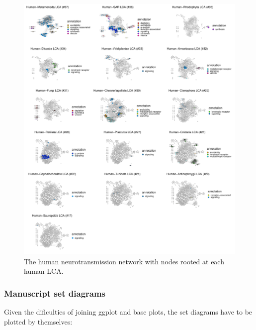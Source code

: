 \begin{figure}

{\centering \includegraphics{figs/analysis.network.unnamed-chunk-16-1} 

}

\caption{The human neurotransmission network with nodes rooted at each human LCA.}\label{fig:unnamed-chunk-16}
\end{figure}

\hypertarget{manuscript-set-diagrams}{%
\subsubsection{Manuscript set diagrams}\label{manuscript-set-diagrams}}

Given the dificulties of joining ggplot and base plots, the set diagrams
have to be plotted by themselves:

